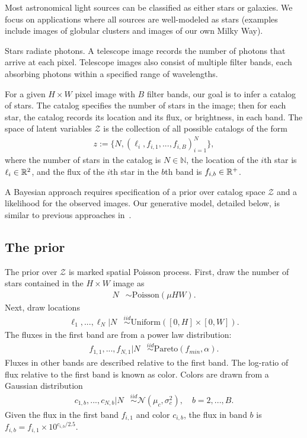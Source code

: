 Most astronomical light sources can be classified as either stars or galaxies. We focus on applications where all sources are well-modeled as stars (examples include images of globular clusters and images of our own Milky Way). 

Stars radiate photons. 
A telescope image records the number of photons that arrive at each pixel. Telescope images also consist of multiple filter bands, each absorbing photons within a specified range of wavelengths. 

For a given $H \times W$ pixel image with $B$ filter bands, our goal is to infer a catalog of 
stars. 
The catalog specifies the number of stars 
in the image; then for each star, the catalog 
records its location and its flux, or brightness,
in each band. 
The space of latent variables 
$\mathcal{Z}$ is the collection of all possible catalogs of the form
\begin{align}
    z := \{N, (\ell_i, f_{i,1}, ..., f_{i,B})_{i = 1}^N\},
    \label{eq:cat_formulation}
\end{align}
where the number of stars in the catalog
is $N\in\mathbb{N}$,
the location of the $i$th star is $\ell_i \in \mathbb{R}^2$, and 
the flux of the $i$th star in the $b$th band is $f_{i, b}\in\mathbb{R}^+$. 

A Bayesian approach requires specification of a prior over catalog space $\mathcal{Z}$ and a likelihood for the observed images. Our generative model, detailed below, is similar to previous approaches in~\cite{Brewer_2013, Portillo_2017, Feder_2019, regier2019_celeste}. 

\subsection{The prior}
The prior over $\mathcal{Z}$ is marked spatial Poisson process. First, draw the number of stars contained in the $H\times W$ image as
\begin{align}
	N &\sim \text{Poisson}(\mu HW).
	\label{eq:n_prior}
\end{align}
Next, draw locations
\begin{align}
  \ell_1, ..., \ell_N | N &\stackrel{iid}{\sim} \text{Uniform}([0, H] \times [0, W]). 
 \end{align}
The fluxes in the first band are from a power law distribution:
\begin{align}
    f_{1, 1}, ..., f_{N,1} | N & 
    \stackrel{iid}{\sim} \text{Pareto}(f_{min}, \alpha) 
    \label{eq:flux_prior}.
\end{align}
Fluxes in other bands are described relative to the first band. The log-ratio of flux relative to the first band is
known as color. Colors are drawn from a Gaussian distribution
\begin{align}
  c_{1, b}, ..., c_{N,b} | N  & 
      \stackrel{iid}{\sim} \mathcal{N}(\mu_c, \sigma^2_c), \quad b = 2, ..., B.
\end{align}
Given the flux in the first band $f_{i,1}$ and color $c_{i,b}$,
the flux in band $b$ is  $f_{i,b} = f_{i,1} \times 10^{c_{i,b} / 2.5}$.

